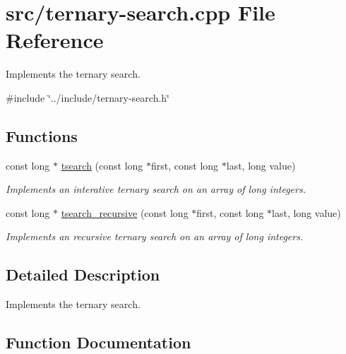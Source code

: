 \hypertarget{ternary-search_8cpp}{}\section{src/ternary-\/search.cpp File Reference}
\label{ternary-search_8cpp}


Implements the ternary search.  


{\ttfamily \#include \char`\"{}../include/ternary-\/search.\+h\char`\"{}}\newline
\subsection*{Functions}
\begin{DoxyCompactItemize}
\item 
const long $\ast$ \mbox{\hyperlink{ternary-search_8cpp_a5d1e6d2319a9d23db3a04557e0811c81}{tsearch}} (const long $\ast$first, const long $\ast$last, long value)
\begin{DoxyCompactList}\small\item\em Implements an interative ternary search on an array of long integers. \end{DoxyCompactList}\item 
const long $\ast$ \mbox{\hyperlink{ternary-search_8cpp_a3c64aebf53564a9b55057f719360e70c}{tsearch\+\_\+recursive}} (const long $\ast$first, const long $\ast$last, long value)
\begin{DoxyCompactList}\small\item\em Implements an recursive ternary search on an array of long integers. \end{DoxyCompactList}\end{DoxyCompactItemize}


\subsection{Detailed Description}
Implements the ternary search. 



\subsection{Function Documentation}
\mbox{\label{ternary-search_8cpp_a5d1e6d2319a9d23db3a04557e0811c81}} 
